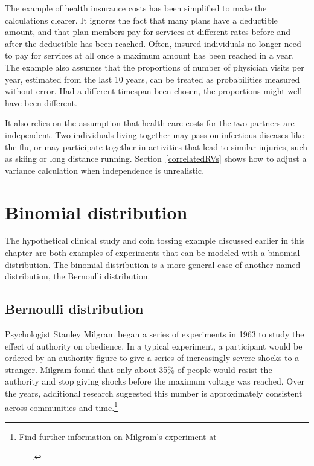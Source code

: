 The example of health insurance costs has been simplified to make the calculations clearer.  It ignores the fact that many plans have a deductible amount, and that plan members pay for services at different rates before and after the deductible has been reached. Often, insured individuals no longer need to pay for services at all once a maximum amount has been reached in a year. The example also assumes that the proportions of number of physician visits per year, estimated from the last 10 years, can be treated as probabilities measured without error. Had a different timespan been chosen, the proportions might well have been different.  

It also relies on the assumption that health care costs for the two partners are independent.  Two individuals living together may pass on infectious diseases like the flu, or may participate together in activities that lead to similar injuries, such as skiing or long distance running.  Section~\ref{correlatedRVs} shows how to adjust a variance calculation when independence is unrealistic.



\section{Binomial distribution}
\label{binomialModel}

The hypothetical clinical study and coin tossing example discussed earlier in this chapter are both examples of experiments that can be modeled with a binomial distribution. The binomial distribution is a more general case of another named distribution, the Bernoulli distribution.


\subsection{Bernoulli distribution}
\label{bernoulli}


Psychologist Stanley Milgram began a series of experiments in 1963 to study the effect of authority on obedience. In a typical experiment, a participant would be ordered by an authority figure to give a series of increasingly severe shocks to a stranger. Milgram found that only about 35\% of people would resist the authority and stop giving shocks before the maximum voltage was reached. Over the years, additional research suggested this number is approximately consistent across communities and time.\footnote{Find further information on Milgram's experiment at \par \ \ \hspace{0.2mm}\ .}

